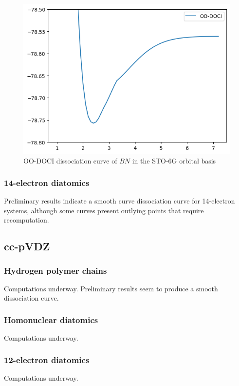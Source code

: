 \documentclass[twoside,twocolumn,9pt]{article}
\begin{document}
\begin{figure}[h]
  \includegraphics[width=\linewidth]{BN.png}
  \caption{OO-DOCI dissociation curve of $BN$ in the STO-6G orbital basis}\label{BN_bad}
\end{figure}


\subsubsection{14-electron diatomics}

Preliminary results indicate a smooth curve dissociation curve for 14-electron systems, although some curves present outlying points that require recomputation.


\subsection{cc-pVDZ}
\subsubsection{Hydrogen polymer chains}
Computations underway. Preliminary results seem to produce a smooth dissociation curve.

\subsubsection{Homonuclear diatomics}
Computations underway.

\subsubsection{12-electron diatomics}
Computations underway.
\end{document}
